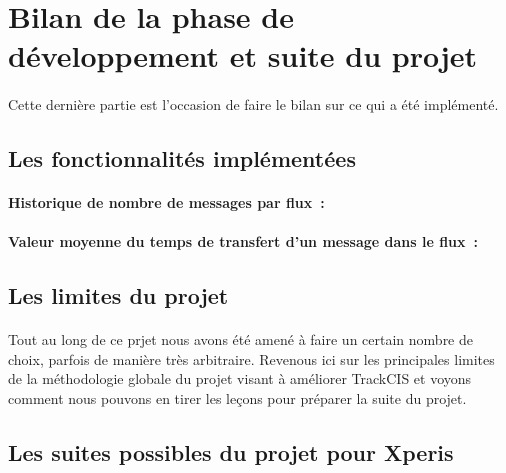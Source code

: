 	
	\section{Bilan de la phase de développement et suite du projet}
		\paragraph{}
		Cette dernière partie est l'occasion de faire le bilan sur ce qui a été
		implémenté.
		
		\subsection{Les fonctionnalités implémentées}
			\paragraph{}%
		
			\paragraph{Historique de nombre de messages par flux~: }
			
			\paragraph{Valeur moyenne du temps de transfert d'un message dans le flux~: }
		
		\subsection{Les limites du projet}
			\paragraph{}%
			Tout au long de ce prjet nous avons été amené à faire un certain nombre de
			choix, parfois de manière très arbitraire. Revenous ici sur les principales
			limites de la méthodologie globale du projet visant à améliorer TrackCIS et
			voyons comment nous pouvons en tirer les leçons pour préparer la suite du
			projet.
		
			\paragraph{}%
			
			\paragraph{}%
			
		\subsection{Les suites possibles du projet pour Xperis}
			\paragraph{}%
			
			\paragraph{}%
			
			